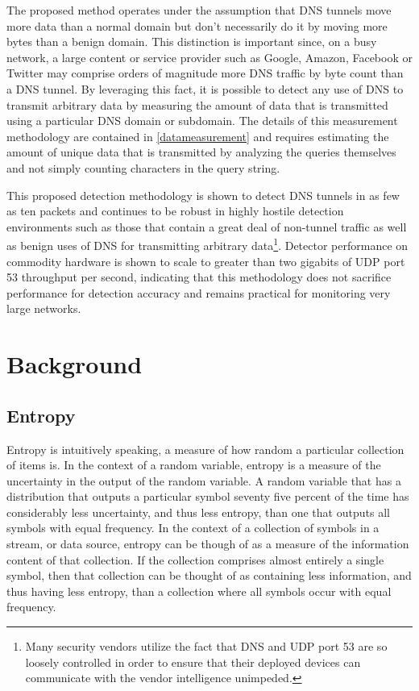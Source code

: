 \documentclass[12pt]{report}
\theoremstyle{remark}
\theoremstyle{definition}
\theoremstyle{definition}
\theoremstyle{definition}
\begin{document}
The proposed method operates under the assumption that DNS tunnels move more
data than a normal domain but don't necessarily do it by moving more bytes than
a benign domain. This distinction is important since, on a busy network, a large
content or service provider such as Google, Amazon, Facebook or Twitter may
comprise orders of magnitude more DNS traffic by byte count than a DNS tunnel.
By leveraging this fact, it is possible to detect
any use of DNS to transmit arbitrary data by measuring the amount of data that
is transmitted using a particular DNS domain or subdomain. The details of this
measurement methodology are contained in \ref{datameasurement} and requires
estimating the amount of unique data that is transmitted by analyzing the
queries themselves and not simply counting characters in the query string.

This proposed detection methodology is shown to detect DNS tunnels in as few as
ten packets and continues to be robust in highly hostile detection environments
such as those that contain a great deal of non-tunnel traffic as well as benign
uses of DNS for transmitting arbitrary data\footnote{Many security vendors
utilize the fact that DNS and UDP port 53 are so loosely controlled in order to
ensure that their deployed devices can communicate with the vendor intelligence
unimpeded.}. Detector performance on commodity hardware is shown to scale to
greater than two gigabits of UDP port 53 throughput per second, indicating that
this methodology does not sacrifice performance for detection accuracy and
remains practical for monitoring very large networks.

\newpage

\chapter{Background}

\section{Entropy}
Entropy is intuitively speaking, a measure of how random a particular collection
of items is. In the context of a random variable, entropy is a measure of the
uncertainty in the output of the random variable. A random variable that has a
distribution that outputs a particular symbol seventy five percent of the time
has considerably less uncertainty, and thus less entropy, than one that outputs
all symbols with equal frequency. In the context of a collection of symbols in a
stream, or data source, entropy can be though of as a measure of the information
content of that collection. If the collection comprises almost entirely a single
symbol, then that collection can be thought of as containing less information,
and thus having less entropy, than a collection where all symbols occur with
equal frequency.
\end{document}
